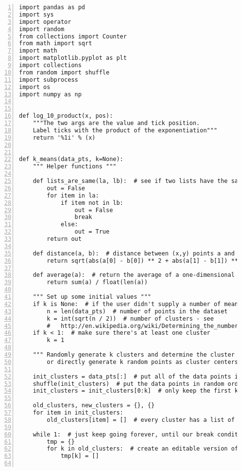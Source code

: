 \begin{lstlisting}[numbers=left, breaklines=true]
import pandas as pd
import sys
import operator
import random
from collections import Counter
from math import sqrt
import math
import matplotlib.pyplot as plt
import collections
from random import shuffle
import subprocess
import os
import numpy as np


def log_10_product(x, pos):
    """The two args are the value and tick position.
    Label ticks with the product of the exponentiation"""
    return '%1i' % (x)


def k_means(data_pts, k=None):
    """ Helper functions """

    def lists_are_same(la, lb):  # see if two lists have the same elements
        out = False
        for item in la:
            if item not in lb:
                out = False
                break
            else:
                out = True
        return out

    def distance(a, b):  # distance between (x,y) points a and b
        return sqrt(abs(a[0] - b[0]) ** 2 + abs(a[1] - b[1]) ** 2)

    def average(a):  # return the average of a one-dimensional list (e.g., [1, 2, 3])
        return sum(a) / float(len(a))

    """ Set up some initial values """
    if k is None:  # if the user didn't supply a number of means to look for, try to estimate how many there are
        n = len(data_pts)  # number of points in the dataset
        k = int(sqrt(n / 2))  # number of clusters - see
        #   http://en.wikipedia.org/wiki/Determining_the_number_of_clusters_in_a_data_set#Rule_of_thumb
    if k < 1:  # make sure there's at least one cluster
        k = 1

    """ Randomly generate k clusters and determine the cluster centers,
        or directly generate k random points as cluster centers. """

    init_clusters = data_pts[:]  # put all of the data points into clusters
    shuffle(init_clusters)  # put the data points in random order
    init_clusters = init_clusters[0:k]  # only keep the first k random clusters

    old_clusters, new_clusters = {}, {}
    for item in init_clusters:
        old_clusters[item] = []  # every cluster has a list of points associated with it. Initially, it's 0

    while 1:  # just keep going forever, until our break condition is met
        tmp = {}
        for k in old_clusters:  # create an editable version of the old_clusters dictionary
            tmp[k] = []


\end{lstlisting}
